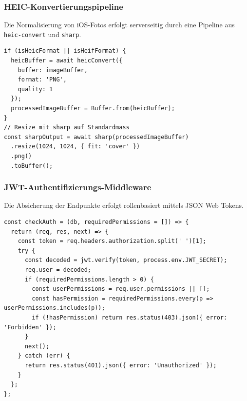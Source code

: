 \subsubsection{HEIC-Konvertierungspipeline}
Die Normalisierung von iOS-Fotos erfolgt serverseitig durch eine Pipeline aus \texttt{heic-convert} und \texttt{sharp}.
\begin{lstlisting}
if (isHeicFormat || isHeifFormat) {
  heicBuffer = await heicConvert({
    buffer: imageBuffer,
    format: 'PNG',
    quality: 1
  });
  processedImageBuffer = Buffer.from(heicBuffer);
}
// Resize mit sharp auf Standardmass
const sharpOutput = await sharp(processedImageBuffer)
  .resize(1024, 1024, { fit: 'cover' })
  .png()
  .toBuffer();
\end{lstlisting}

\subsubsection{JWT-Authentifizierungs-Middleware}
Die Absicherung der Endpunkte erfolgt rollenbasiert mittels JSON Web Tokens.
\begin{lstlisting}
const checkAuth = (db, requiredPermissions = []) => {
  return (req, res, next) => {
    const token = req.headers.authorization.split(' ')[1];
    try {
      const decoded = jwt.verify(token, process.env.JWT_SECRET);
      req.user = decoded;
      if (requiredPermissions.length > 0) {
        const userPermissions = req.user.permissions || [];
        const hasPermission = requiredPermissions.every(p => userPermissions.includes(p));
        if (!hasPermission) return res.status(403).json({ error: 'Forbidden' });
      }
      next();
    } catch (err) {
      return res.status(401).json({ error: 'Unauthorized' });
    }
  };
};
\end{lstlisting}

